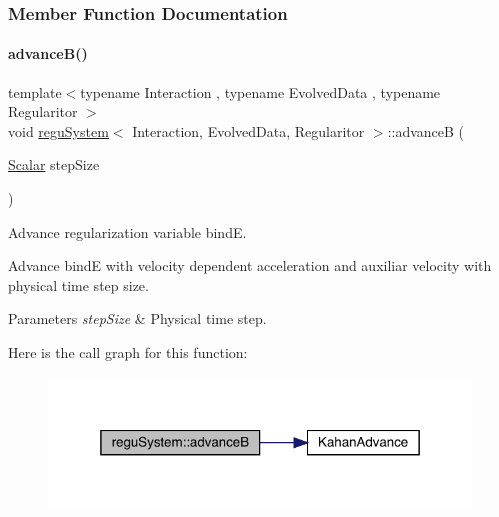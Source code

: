 \subsubsection{Member Function Documentation}
\mbox{\label{classregu_system_a0a74b00e0e5124a27d0dc90b969f83cc}} 
\paragraph{\texorpdfstring{advance\+B()}{advanceB()}}
{\footnotesize\ttfamily template$<$typename Interaction , typename Evolved\+Data , typename Regularitor $>$ \\
void \mbox{\hyperlink{classregu_system}{regu\+System}}$<$ Interaction, Evolved\+Data, Regularitor $>$\+::advanceB (\begin{DoxyParamCaption}\item[{\mbox{\hyperlink{classregu_system_aca8ee2c387943164ee3ea68370fc3ac0}{Scalar}}}]{step\+Size }\end{DoxyParamCaption})\hspace{0.3cm}{\ttfamily [private]}}



Advance regularization variable bindE. 

Advance bindE with velocity dependent acceleration and auxiliar velocity with physical time step size. 
\begin{DoxyParams}{Parameters}
{\em step\+Size} & Physical time step. \\
\hline
\end{DoxyParams}
Here is the call graph for this function\+:\nopagebreak
\begin{figure}[H]
\begin{center}
\leavevmode
\includegraphics[width=319pt]{classregu_system_a0a74b00e0e5124a27d0dc90b969f83cc_cgraph}
\end{center}
\end{figure}
\mbox{\label{classregu_system_ad04ed572a5718219d506af6cd924a395}} 
